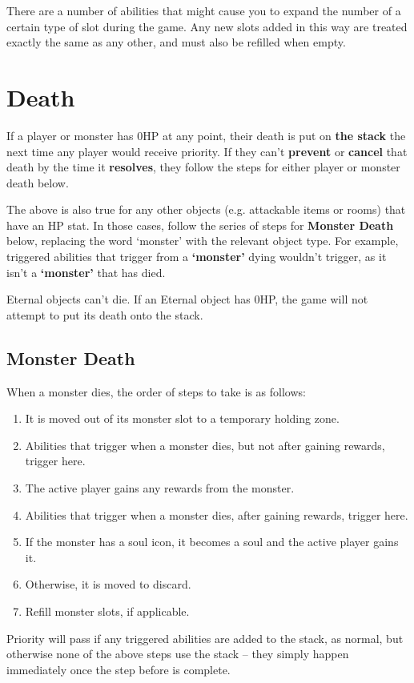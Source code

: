 \documentclass[10pt, a4paper, twoside]{article} %
\begin{document}
    There are a number of abilities that might cause you to expand the number of a certain type of slot during the game. Any new slots added in this way are treated exactly the same as any other, and must also be refilled when empty.

    \section{Death}
    \label{death}
    If a player or monster has 0HP at any point, their death is put on \textbf{the stack} the next time any player would receive priority. If they can’t \textbf{prevent} or \textbf{cancel} that death by the time it \textbf{resolves}, they follow the steps for either player or monster death below.

    The above is also true for any other objects (e.g. attackable items or rooms) that have an HP stat. In those cases, follow the series of steps for \textbf{Monster Death} below, replacing the word ‘monster’ with the relevant object type. For example, triggered abilities that trigger from a \textbf{‘monster’} dying wouldn’t trigger, as it isn’t a \textbf{‘monster’} that has died.

    Eternal objects can’t die. If an Eternal object has 0HP, the game will not attempt to put its death onto the stack.

    \subsection{Monster Death}
    \label{monsterdeath}
    When a monster dies, the order of steps to take is as follows:
    \begin{enumerate}
        \item It is moved out of its monster slot to a temporary holding zone.
        \item Abilities that trigger when a monster dies, but not after gaining rewards, trigger here.
        \item The active player gains any rewards from the monster.
        \item Abilities that trigger when a monster dies, after gaining rewards, trigger here.
        \item If the monster has a soul icon, it becomes a soul and the active player gains it. 
        \item Otherwise, it is moved to discard.
        \item Refill monster slots, if applicable.
    \end{enumerate}
    Priority will pass if any triggered abilities are added to the stack, as normal, but otherwise none of the above steps use the stack – they simply happen immediately once the step before is complete.
\end{document}
